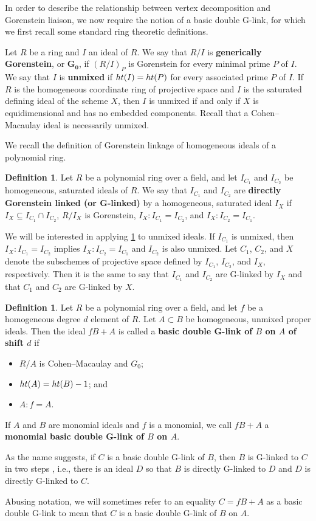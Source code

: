 \documentclass[12pt, reqno]{amsart}
\numberwithin{equation}{section}
\newtheorem{Main Conjecture}[theorem]{Main Conjecture}
\theoremstyle{definition}
\newtheorem{defn}[theorem]{Definition}
\theoremstyle{plain}
\newcommand{\hgt}{{\rm{ht }}}
\begin{document}
In order to describe the relationship between vertex decomposition and Gorenstein liaison, we now require the notion of a basic double G-link, for which we first recall some standard ring theoretic definitions.

Let $R$ be a ring and $I$ an ideal of $R$. We say that $R/I$ is \textbf{generically Gorenstein}, or $\mathbf{G_0}$, if $(R/I)_P$ is Gorenstein for every minimal prime $P$ of $I$. We say that $I$ is \textbf{unmixed} if $\hgt(I) = \hgt(P)$ for every associated prime $P$ of $I$.  If $R$ is the homogeneous coordinate ring of projective space and $I$ is the saturated defining ideal of the scheme $X$, then $I$ is unmixed if and only if $X$ is equidimensional and has no embedded components.  Recall that a Cohen--Macaulay ideal is necessarily unmixed. 


 We recall the definition of Gorenstein linkage of homogeneous ideals of a polynomial ring.

\begin{defn}\label{def:GorensteinLikage}
    Let $R$ be a polynomial ring over a field, and let $I_{C_1}$ and $I_{C_2}$ be homogeneous, saturated ideals of $R$. We say that $I_{C_1}$ and $I_{C_2}$ are \textbf{directly Gorenstein linked (or G-linked)} by a homogeneous, saturated ideal $I_X$ if $I_X \subseteq I_{C_1} \cap I_{C_2}$, $R/I_X$ is Gorenstein, $I_X:I_{C_1} = I_{C_2}$, and $I_X:I_{C_2} = I_{C_1}$.  
\end{defn}

We will be interested in applying \cref{def:GorensteinLikage} to unmixed ideals.  If $I_{C_1}$ is unmixed, then $I_X:I_{C_1} = I_{C_2}$ implies $I_X:I_{C_2} = I_{C_1}$ and $I_{C_2}$ is also unmixed.  Let $C_1$, $C_2$, and $X$ denote the subschemes of projective space defined by $I_{C_1}$, $I_{C_2}$, and $I_X$, respectively.  Then it is the same to say that $I_{C_1}$ and $I_{C_2}$ are G-linked by $I_X$ and that $C_1$ and $C_2$ are G-linked by $X$.

\begin{defn}\label{def:basic double G-link} 
Let $R$ be a polynomial ring over a field, and let $f$ be a homogeneous degree $d$ element of $R$.  Let $A\subset B$ be homogeneous, unmixed proper ideals. Then the ideal $fB+A$ is called a \textbf{basic double G-link of $B$ on $A$ of shift $d$} if  
\begin{itemize}
    \item $R/A$ is Cohen--Macaulay and $G_0$;
    \item $\hgt(A) = \hgt(B)-1$; and
    \item $A:f=A$.
\end{itemize}
   If $A$ and $B$ are monomial ideals and $f$ is a monomial, we call $f B+A$ a \textbf{monomial basic double G-link of $B$ on $A$}. 

   As the name suggests, if $C$ is a basic double G-link of $B$, then $B$ is G-linked to $C$ in two steps \cite[Proposition 5.10]{KMM+01}, i.e., there is an ideal $D$ so that $B$ is directly G-linked to $D$ and $D$ is directly G-linked to $C$. 

Abusing notation, we will sometimes refer to an equality $C = fB+A$ as a basic double G-link to mean that $C$ is a basic double G-link of $B$ on $A$.
\end{defn}
\end{document}
